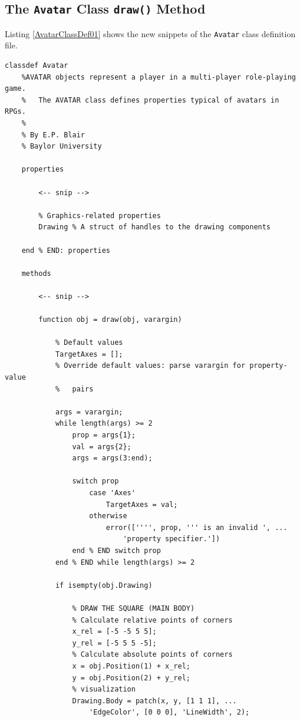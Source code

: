 \subsection{The \texttt{Avatar} Class \texttt{draw()} Method}
Listing \ref{AvatarClassDef01} shows the new snippets of the \texttt{Avatar} class definition file.
\begin{lstlisting}[style=Matlab-editor, label=AvatarClassDef01, caption={A \texttt{draw()} method was added to the \texttt{Avatar} class.}]
classdef Avatar
    %AVATAR objects represent a player in a multi-player role-playing game.
    %   The AVATAR class defines properties typical of avatars in RPGs.
    %
    % By E.P. Blair
    % Baylor University
    
    properties
        
        <-- snip -->        

        % Graphics-related properties
        Drawing % A struct of handles to the drawing components
        
    end % END: properties
    
    methods

        <-- snip -->        
                
        function obj = draw(obj, varargin)
            
            % Default values 
            TargetAxes = [];
            % Override default values: parse varargin for property-value
            %   pairs
            
            args = varargin;
            while length(args) >= 2
                prop = args{1};
                val = args{2};
                args = args(3:end);
                
                switch prop
                    case 'Axes'
                        TargetAxes = val;
                    otherwise
                        error(['''', prop, ''' is an invalid ', ...
                            'property specifier.'])
                end % END switch prop
            end % END while length(args) >= 2 
            
            if isempty(obj.Drawing)
                
                % DRAW THE SQUARE (MAIN BODY)
                % Calculate relative points of corners
                x_rel = [-5 -5 5 5];
                y_rel = [-5 5 5 -5];
                % Calculate absolute points of corners
                x = obj.Position(1) + x_rel;
                y = obj.Position(2) + y_rel;
                % visualization
                Drawing.Body = patch(x, y, [1 1 1], ...
                    'EdgeColor', [0 0 0], 'LineWidth', 2);


\end{lstlisting}
